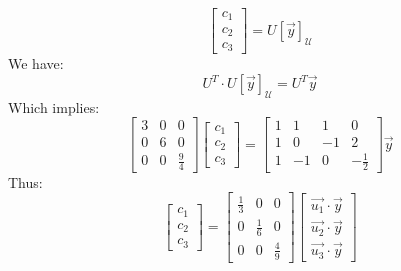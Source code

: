 \begin{eg}
\[\begin{bmatrix}
            c_1 \\ c_2 \\ c_3
        \end{bmatrix} = U [\vec{y}]_{\mathcal{U}}
    \]
    We have:
    \[
        U^T \cdot U [\vec{y}]_{\mathcal{U}} = U^T \vec{y}
    \]
    Which implies:
    \[
        \begin{bmatrix}
            3 & 0 & 0 \\
            0 & 6 & 0 \\
            0 & 0 & \frac{9}{4}
        \end{bmatrix}
        \begin{bmatrix}
            c_1 \\ c_2 \\ c_3
        \end{bmatrix} = \begin{bmatrix}
            1 & 1 & 1 & 0 \\
            1 & 0 & -1 & 2 \\
            1 & -1 & 0 & -\frac{1}{2}
        \end{bmatrix} \vec{y}
    \]
    Thus:
    \[
        \begin{bmatrix}
            c_1 \\ c_2 \\ c_3
        \end{bmatrix} = \begin{bmatrix}
            \frac{1}{3} & 0 & 0 \\
            0 & \frac{1}{6} & 0 \\
            0 & 0 & \frac{4}{9}
        \end{bmatrix} \begin{bmatrix}
            \vec{u_1} \cdot \vec{y} \\
            \vec{u_2} \cdot \vec{y} \\
            \vec{u_3} \cdot \vec{y}
        \end{bmatrix}
    \]
\end{eg}

